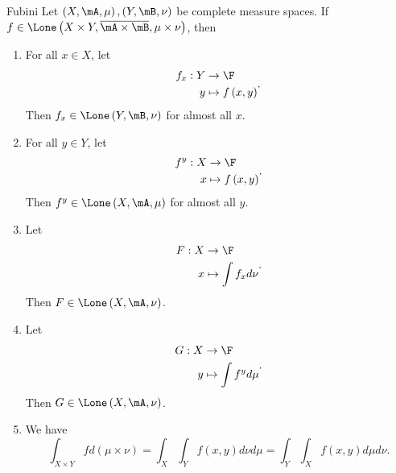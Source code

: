 \documentclass[pmath451]{subfiles}
\begin{document}
    \begin{theorem}{Fubini}
        Let $\left( X,\mA,\mu \right),\left( Y,\mB,\nu \right)$ be complete measure spaces. If $f\in\Lone\left( X\times Y,\overline{\mA\times\mB},\mu\times\nu \right)$, then
        \begin{enumerate}
            \item For all $x\in X$, let
                \begin{equation*}
                    \begin{aligned}
                        f_x:Y&\to\F \\
                        y&\mapsto f\left( x,y \right)
                    \end{aligned}.
                \end{equation*}
                Then $f_x\in\Lone\left( Y,\mB,\nu \right)$ for almost all $x$.
            \item For all $y\in Y$, let
                \begin{equation*}
                    \begin{aligned}
                        f^y:X&\to\F \\
                        x&\mapsto f\left( x,y \right)
                    \end{aligned}.
                \end{equation*}
                Then $f^y\in\Lone\left( X,\mA,\mu \right)$ for almost all $y$.
            \item Let
                \begin{equation*}
                    \begin{aligned}
                        F:X&\to\F \\
                        x&\mapsto\int f_xd\nu
                    \end{aligned} .
                \end{equation*}
                Then $F\in\Lone\left( X,\mA,\nu \right)$.
            \item Let
                \begin{equation*}
                    \begin{aligned}
                        G:X&\to\F \\
                        y&\mapsto\int f^yd\mu
                    \end{aligned} .
                \end{equation*}
                Then $G\in\Lone\left( X,\mA,\nu \right)$.
            \item We have
                \begin{equation*}
                    \int_{X\times Y} fd\left( \mu\times\nu \right) = \int_X\int_Y f\left( x,y \right)d\nu d\mu = \int_Y\int_Xf\left( x,y \right)d\mu d\nu.
                \end{equation*}
        \end{enumerate}
    \end{theorem}
\end{document}

